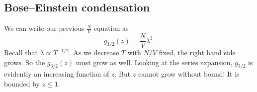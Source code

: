\documentclass[a4paper]{article}
\begin{document}
%

\subsection{Bose--Einstein condensation}
%
We can write our previous $\frac{N}{V}$ equation as
\[
  g_{3/2}(z) = \frac{N}{V} \lambda^3.\tag{$\dagger$}
\]
Recall that $\lambda \propto T^{-1/2}$. As we decrease $T$ with $N/V$ fixed, the right hand side grows. So the $g_{3/2}(z)$ must grow as well. Looking at the series expansion, $g_{3/2}$ is evidently an increasing function of $z$. But $z$ cannot grow without bound! It is bounded by $z \leq 1$.
\end{document}
